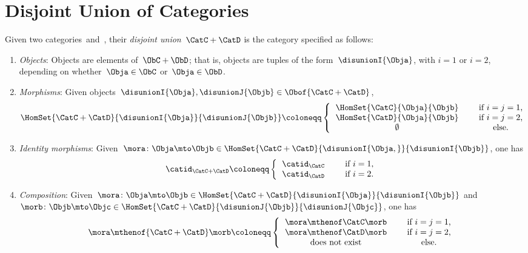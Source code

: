 
\section{Disjoint Union of Categories}

\begin{ctdefinition}
	\label{def:disjoint-union-category}
	Given two categories~\CatC and~\CatD, their \emph{disjoint union}~$\CatC + \CatD$ is the category specified as follows:
	\begin{enumerate}
		\item \emph{Objects}: Objects are elements of~$\ObC + \ObD$; that is, objects are tuples of the form~$\disunionI{\Obja}$, with $i=1$ or $i=2$, depending on whether~$\Obja \in \ObC$ or~$\Obja \in \ObD$.
		\item \emph{Morphisms}: Given objects~$\disunionI{\Obja}, \disunionJ{\Objb} \in \Obof{\CatC + \CatD}$,
		      \begin{equation}
			      \HomSet{\CatC + \CatD}{\disunionI{\Obja}}{\disunionJ{\Objb}} \coloneqq
			      \left\{
			      \begin{tabular}{ccc}
				      $\HomSet{\CatC}{\Obja}{\Objb}$ &  & if $i=j = 1$,  \\
				      $\HomSet{\CatD}{\Obja}{\Objb}$ &  & if $i = j =2$, \\
				      $\emptyset$                    &  & else.
			      \end{tabular}
			      \right.
		      \end{equation}
		\item \emph{Identity morphisms}: Given~$\mora\colon \Obja \mto \Objb\in \HomSet{\CatC + \CatD}{\disunionI{\Obja, }}{\disunionI{\Objb}}$, one has
		      \begin{equation}
			      \catid_{\CatC+\CatD} \coloneqq
			      \left\{
			      \begin{tabular}{ccc}
				      $\catid_\CatC$ &  & if $i=1$, \\
				      $\catid_\CatD$ &  & if $i=2$.
			      \end{tabular}
			      \right.
		      \end{equation}
		\item \emph{Composition}: Given~$\mora\colon \Obja \mto \Objb\in \HomSet{\CatC + \CatD}{\disunionI{\Obja}}{\disunionI{\Objb}}$ and~$\morb\colon \Objb\mto \Objc\in \HomSet{\CatC + \CatD}{\disunionJ{\Objb}}{\disunionJ{\Objc}}$, one has
		      \begin{equation}
			      \mora \mthenof{\CatC+\CatD} \morb \coloneqq
			      \left\{
			      \begin{tabular}{ccc}
				      $\mora\mthenof\CatC \morb$  &  & if $i=j = 1$,  \\
				      $\mora \mthenof\CatD \morb$ &  & if $i = j =2$, \\
				      does not exist              &  & else.
			      \end{tabular}
			      \right.
		      \end{equation}
	\end{enumerate}
\end{ctdefinition}

